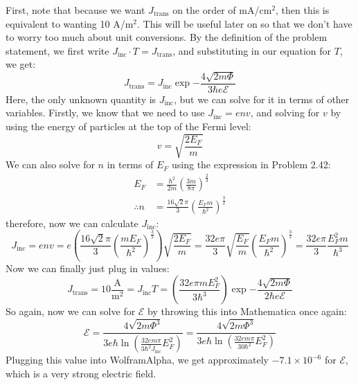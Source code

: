 \documentclass[10pt]{article}
\begin{document}
\begin{enumerate}[label=\alph*)]
			\begin{solution}
				First, note that because we want $J_{\text{trans}}$ on the order of mA/$\text{cm}^2$, then this 
				is equivalent to wanting 10 A/$\text{m}^2$. This will be useful later on so that we don't have
				to worry too much about unit conversions. By the definition of the problem statement, we first
				write $J_{\text{inc}} \cdot T
				= J_{\text{trans}}$, and substituting in our equation for $T$, we get:
				\[
					J_{\text{trans}} = J_{\text{inc}} \exp{-\frac{4\sqrt{2m\Phi}}{3\hbar e \mathcal E}}
				\] 
				Here, the only unknown quantity is $J_{\text{inc}}$, but we can solve for it in terms of 
				other variables. Firstly, we know that we need to use $J_{\text{inc}} = env$, and solving 
				for $v$ by using the energy of particles at the top of the Fermi level:
				\[
					v = \sqrt{\frac{2E_F}{m}} 
				\] 
				We can also solve for $n$ in terms of $E_F$ using the expression in Problem 2.42:
				\begin{align*}
					E_F &= \frac{\hbar^2}{2m}\left( \frac{3m}{8\pi} \right) ^{\frac{2}{3}}\\
					\therefore n &= \frac{16 \sqrt{2} \pi }{3}\left( \frac{E_F m}{\hbar^2} \right)^{\frac{3}{2}}
				\end{align*}
				therefore, now we can calculate $J_{\text{inc}}$:
				\[
					J_{\text{inc}} = env = e\left( \frac{16 \sqrt{2} \pi}{3}\left( \frac{m E_F}{\hbar^2} \right)^{\frac{3}{2}} \right) \sqrt{\frac{2E_F}{m}} = \frac{32e\pi}{3}\sqrt{\frac{E_F}{m}}\left( \frac{E_F m}{\hbar^2} \right)^{\frac{3}{2}} = \frac{32 e\pi}{3} \frac{E_F^2 m}{\hbar^3} 
				\] 
				Now we can finally just plug in values:
				\[
				J_{\text{trans}} = 10 \frac{\mathrm A}{\mathrm m^2}= J_{\text{inc}} T = \left( \frac{32 e\pi m E_F^2}{3\hbar^3} \right) \exp{-\frac{4\sqrt{2m \Phi}}{2 \hbar e \mathcal E}} 
				\] 
				So again, now we can solve for $\mathcal E$ by throwing this into Mathematica once again:
				\[
					\mathcal E = \frac{4\sqrt{2m \Phi^3}}{3e \hbar \ln \left( \frac{32 em \pi}{3 \hbar^2 J_{\text{inc}}} E_F^2 \right) }  = \frac{4\sqrt{2m \Phi^3}}{3e \hbar \ln \left( \frac{32 em \pi}{30 \hbar^2} E_F^2 \right) } 
				\] 
				Plugging this value into WolframAlpha, we get approximately $-7.1 \times 10^{-6}$ for $\mathcal 
				E$, which is a very strong electric field.   
			\end{solution}
	\end{enumerate}
\end{document}
